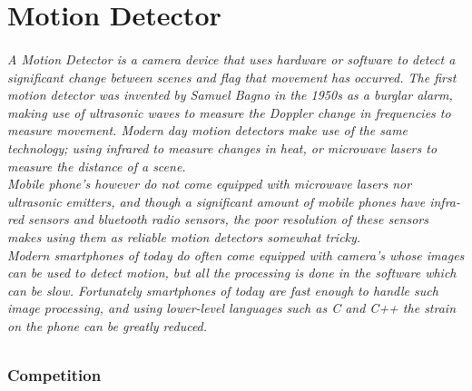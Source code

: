 %
%
%
%
%



\part{Motion Detector}
\paragraph{A Motion Detector is a camera device that uses hardware or software to detect a significant change between scenes and flag that movement has occurred. The first motion detector was invented by Samuel Bagno in the 1950s as a burglar alarm, making use of ultrasonic waves to measure the Doppler change in frequencies to measure movement. Modern day motion detectors make use of the same technology; using infrared to measure changes in heat, or microwave lasers to measure the distance of a scene.\\
Mobile phone's however do not come equipped with microwave lasers nor ultrasonic emitters, and though a significant amount of mobile phones have infra-red sensors and bluetooth radio sensors, the poor resolution of these sensors makes using them as reliable motion detectors somewhat tricky.\\
Modern smartphones of today do often come equipped with camera's whose images can be used to detect motion, but all the processing is done in the software which can be slow. Fortunately smartphones of today are fast enough to handle such image processing, and using lower-level languages such as C and C++ the strain on the phone can be greatly reduced.}

\section{Competition}
